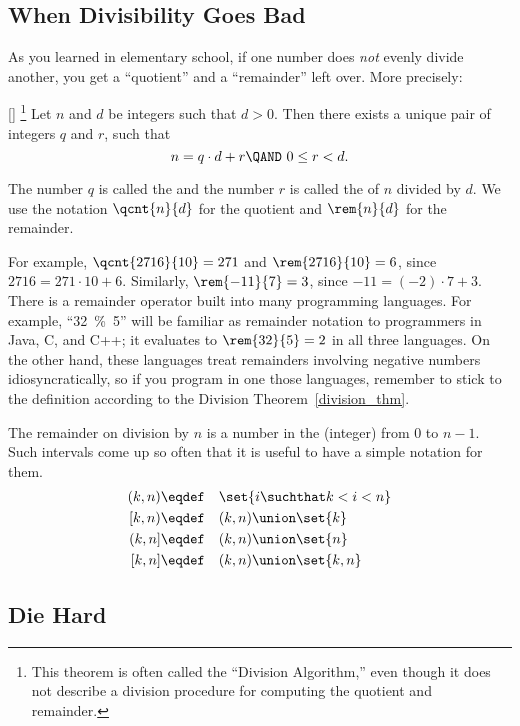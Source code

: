 \subsection{When Divisibility Goes Bad}

As you learned in elementary school, if one number does \emph{not} evenly divide another,
you get a ``quotient'' and a ``remainder'' left over.  More precisely:
\begin{theorem}\label{division_thm}[]%
\footnote{This theorem is often called the ``Division Algorithm,'' even though it does not
  describe a division procedure for computing
 the quotient and remainder.}  Let $n$ and $d$
be integers such that $d > 0$.  Then there exists a unique pair of integers $q$ and $r$,
such that
\begin{equation}\label{nqdr}
n = q \cdot d + r \QAND\ 0 \leq r < d.
\end{equation}
\end{theorem}
The number $q$ is called the  and the number $r$ is called the
 of $n$ divided by $d$.  We use the notation $\qcnt{n}{d}$ for the quotient
and $\rem{n}{d}$ for the remainder.

For example, $\qcnt{2716}{10} = 271$ and $\rem{2716}{10} = 6$, since $2716 = 271 \cdot 10 +
6$.  Similarly, $\rem{-11}{7} = 3$, since $-11 = (-2) \cdot 7 + 3$.  There is a remainder
operator built into many programming languages.  For example, ``32~\%~5'' will be familiar
as remainder notation to programmers in Java, C, and C++; it evaluates to $\rem{32}{5} =2$
in all three languages.  On the other hand, these languages treat remainders involving
negative numbers idiosyncratically, so if you program in one those languages, remember to
stick to the definition according to the Division Theorem~\ref{division_thm}.

The remainder on division by $n$ is a number in the (integer)  from 0 to
$n-1$.  Such intervals come up so often that it is useful to have a simple notation for
them.
\begin{align*}
(k, n) & \eqdef\quad \set{i \suchthat k < i < n}\\ [k, n) & \eqdef\quad (k,n) \union
    \set{k}\\ (k, n] & \eqdef\quad (k,n) \union \set{n}\\ [k,n] & \eqdef\quad (k,n) \union
  \set{k,n}
\end{align*}

\subsection{Die Hard}

